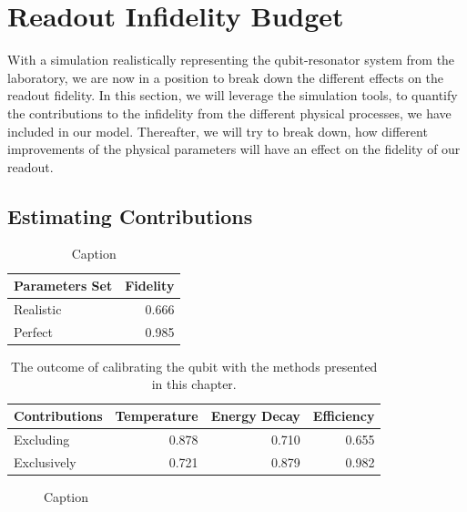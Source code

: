 

\chapter{Readout Infidelity Budget}
With a simulation realistically representing the qubit-resonator system from the laboratory, we are now in a position to break down the different effects on the readout fidelity. In this section, we will leverage the simulation tools, to quantify the contributions to the infidelity from the different physical processes, we have included in our model. Thereafter, we will try to break down, how different improvements of the physical parameters will have an effect on the fidelity of our readout. 

\section{Estimating Contributions}

\begin{table}[h]
    \centering
    \begin{tabular}{l|r}
    \hline
         Parameters Set & Fidelity \\ \hline
         Realistic & 0.666  \\
         Perfect   & 0.985
    \end{tabular}

    \caption{Caption}
    \label{tab:my_label}
\end{table}


\begin{table}[h]
\centering
\caption{The outcome of calibrating the qubit with the methods presented in this chapter.}

\begin{tabular}{l|rrr}
\hline
\textbf{Contributions}        & Temperature     & Energy Decay   & Efficiency  \\ \hline
Excluding                     &  0.878          &  0.710         &  0.655 \\
Exclusively                   &  0.721          &  0.879         &  0.982
\end{tabular}
\label{tab:readout_infidelity_contribution_estimation}
\end{table}

\begin{figure}
    \centering
    \caption{Caption}
    \label{fig:enter-label}
\end{figure}

